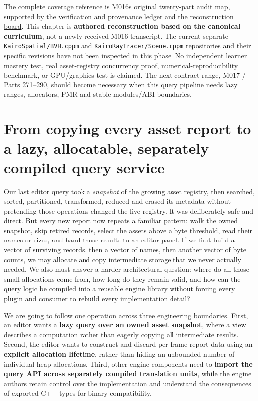 The complete coverage reference is \hyperref[appendix-fd090d982a15-m016-parts-251270-the-asset-registry-becomes-a-query-and-transformation-pipeline]{M016\textquotesingle s original twenty-part audit map}, supported by \hyperref[appendix-a103e7846d21-phase-6-additive-reconstruction-m016-parts-251270]{the verification and provenance ledger} and \hyperref[appendix-960160274237-query-the-registry-without-confusing-identity-and-a-snapshot-m016-reconstruction]{the reconstruction board}. This chapter is \textbf{authored reconstruction based on the canonical curriculum}, not a newly received M016 transcript. The current separate \texttt{KairoSpatial/BVH.cppm} and \texttt{KairoRayTracer/Scene.cppm} repositories and their specific revisions have not been inspected in this phase. No independent learner mastery test, real asset-registry concurrency proof, numerical-reproducibility benchmark, or GPU/graphics test is claimed. The next contract range, M017 / Parts 271--290, should become necessary when this query pipeline needs lazy ranges, allocators, PMR and stable modules/ABI boundaries.

\section{From copying every asset report to a lazy, allocatable, separately compiled query service}\label{01-foundations-i-ch006-from-copying-every-asset-report-to-a-lazy-allocatable-separately-compiled-query-service}

Our last editor query took a \emph{snapshot} of the growing asset registry, then searched, sorted, partitioned, transformed, reduced and erased its metadata without pretending those operations changed the live registry. It was deliberately safe and direct. But every new report now repeats a familiar pattern: walk the owned snapshot, skip retired records, select the assets above a byte threshold, read their names or sizes, and hand those results to an editor panel. If we first build a vector of surviving records, then a vector of names, then another vector of byte counts, we may allocate and copy intermediate storage that we never actually needed. We also must answer a harder architectural question: where do all those small allocations come from, how long do they remain valid, and how can the query logic be compiled into a reusable engine library without forcing every plugin and consumer to rebuild every implementation detail?

We are going to follow one operation across three engineering boundaries. First, an editor wants a \textbf{lazy query over an owned asset snapshot}, where a view describes a computation rather than eagerly copying all intermediate results. Second, the editor wants to construct and discard per-frame report data using an \textbf{explicit allocation lifetime}, rather than hiding an unbounded number of individual heap allocations. Third, other engine components need to \textbf{import the query API across separately compiled translation units}, while the engine authors retain control over the implementation and understand the consequences of exported C++ types for binary compatibility.


